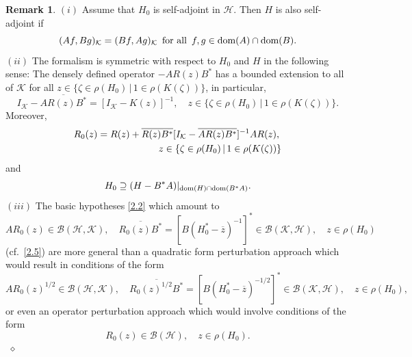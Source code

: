 \documentclass[reqno,10pt, centertags]{amsart}
\newcommand{\cB}{{\mathcal B}}
\newcommand{\cH}{{\mathcal H}}
\newcommand{\cK}{{\mathcal K}}
\newcommand{\lb}{\label}
\newcommand{\ol}{\overline}
\newcommand{\dom}{\text{\rm{dom}}}
\numberwithin{equation}{section}
\theoremstyle{definition}
\newtheorem{remark}[theorem]{Remark}
\begin{document}
\begin{remark} \lb{r2.4}
$(i)$ Assume that $H_0$ is self-adjoint in $\cH$. Then $H$ is also
self-adjoint if
\begin{equation}
(Af,Bg)_{\cK}=(Bf,Ag)_{\cK} \, \text{ for all } \,
f,g\in\dom(A)\cap\dom(B). \lb{2.24}
\end{equation}
$(ii)$ The formalism is symmetric with respect to $H_0$ and $H$ in the
following sense: The densely defined operator $-AR(z)B^*$ has a
bounded extension to all of
$\cK$ for all $z\in\{\zeta\in\rho(H_0)\,|\, 1\in\rho(K(\zeta))\}$, in
particular,
\begin{equation}
I_{\cK}-\ol{AR(z)B^*}=[I_{\cK}-K(z)]^{-1}, \quad
z\in\{\zeta\in\rho(H_0)\,|\, 1\in\rho(K(\zeta))\}. \lb{2.25}
\end{equation}
Moreover,
\begin{align}
\begin{split}
R_0(z)&=R(z)+\ol{R(z)B^*}[I_{\cK}-\ol{AR(z)B^*}]^{-1}AR(z), \\
& \hspace*{2.25cm}
z\in\{\zeta\in\rho(H_0)\,|\, 1\in\rho(K(\zeta))\} \lb{2.26}
\end{split}
\end{align}
and
\begin{equation}
H_0\supseteq (H-B^*A)|_{\dom(H)\cap\dom(B^*A)}.  \lb{2.27}
\end{equation}
$(iii)$ The basic hypotheses \eqref{2.2} which amount to
\begin{equation}
AR_0(z)\in\cB(\cH,\cK), \quad \ol{R_0(z)B^*}=[B(H_0^*-\ol z)^{-1}]^* \in
\cB(\cK,\cH), \quad z\in\rho(H_0)  \lb{2.27a}
\end{equation}
(cf.\ \eqref{2.5}) are more general than a quadratic form perturbation
approach which would result in conditions of the form
\begin{equation}
AR_0(z)^{1/2}\in\cB(\cH,\cK), \quad \ol{R_0(z)^{1/2}B^*}=[B(H_0^*-\ol
z)^{-1/2}]^* \in \cB(\cK,\cH), \quad z\in\rho(H_0),  \lb{2.27b}
\end{equation}
or even an operator perturbation approach which would involve conditions
of the form
\begin{equation}
[B^* A] R_0(z)\in\cB(\cH), \quad z\in\rho(H_0).  \lb{2.27c}
\end{equation}
${}$ \hfill $\diamond$
\end{remark}

\end{document}
